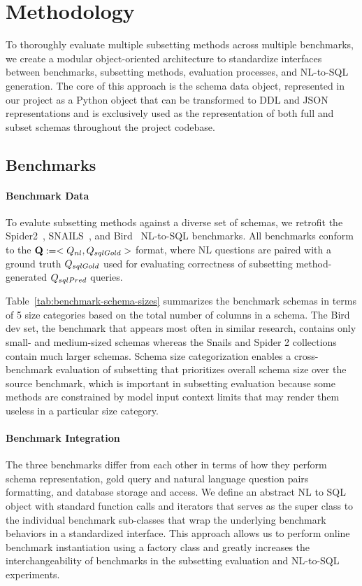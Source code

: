 % 
\section{Methodology}


To thoroughly evaluate multiple subsetting methods across multiple benchmarks, we create a modular object-oriented architecture to standardize interfaces between benchmarks, subsetting methods, evaluation processes, and NL-to-SQL generation.
The core of this approach is the schema data object, represented in our project as a Python object that can be transformed to DDL and JSON representations and is exclusively used as the representation of both full and subset schemas throughout the project codebase.

\subsection{Benchmarks}



\paragraph{\textbf{Benchmark Data}}

To evalute subsetting methods against a diverse set of schemas, we retrofit the Spider2~\cite{benchmark-spider2}, SNAILS~\cite{benchmark-snails}, and Bird~\cite{benchmark-bird} NL-to-SQL benchmarks.
All benchmarks conform to the $\mathbf{Q} := <Q_{nl}, Q_{sqlGold}>$ format, where NL questions are paired with a ground truth $Q_{sqlGold}$ used for evaluating correctness of subsetting method-generated $Q_{sqlPred}$ queries.

Table~\ref{tab:benchmark-schema-sizes} summarizes the benchmark schemas in terms of 5 size categories based on the total number of columns in a schema.
The Bird dev set, the benchmark that appears most often in similar research, contains only small- and medium-sized schemas whereas the Snails and Spider 2 collections contain much larger schemas.
Schema size categorization enables a cross-benchmark evaluation of subsetting that prioritizes overall schema size over the source benchmark, which is important in subsetting evaluation because some methods are constrained by model input context limits that may render them useless in a particular size category.

\paragraph{\textbf{Benchmark Integration}}
The three benchmarks differ from each other in terms of how they perform schema representation, gold query and natural language question pairs formatting, and database storage and access.
We define an abstract NL to SQL object with standard function calls and iterators that serves as the super class to the individual benchmark sub-classes that wrap the underlying benchmark behaviors in a standardized interface. 
This approach allows us to perform online benchmark instantiation using a factory class and greatly increases the interchangeability of benchmarks in the subsetting evaluation and NL-to-SQL experiments.

